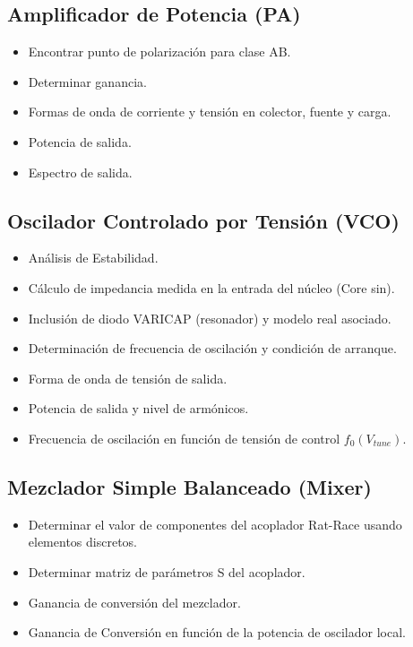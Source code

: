 \subsection{Amplificador de Potencia (PA)}
\begin{itemize}
    \item Encontrar punto de polarización para clase AB.
    \item Determinar ganancia.
    \item Formas de onda de corriente y tensión en colector, fuente y carga.
    \item Potencia de salida.
    \item Espectro de salida.
\end{itemize}

\subsection{Oscilador Controlado por Tensión (VCO)}
\begin{itemize}
    \item Análisis de Estabilidad.
    \item Cálculo de impedancia medida en la entrada del núcleo (Core sin).
    \item Inclusión de diodo VARICAP (resonador) y modelo real asociado.
    \item Determinación de frecuencia de oscilación y condición de arranque.
    \item Forma de onda de tensión de salida.
    \item Potencia de salida y nivel de armónicos.
    \item Frecuencia de oscilación en función de tensión de control $f_0(V_{tune})$.
\end{itemize}

\subsection{Mezclador Simple Balanceado (Mixer)}
\begin{itemize}
    \item Determinar el valor de componentes del acoplador Rat-Race usando elementos discretos.
    \item Determinar matriz de parámetros S del acoplador.
    \item Ganancia de conversión del mezclador.
    \item Ganancia de Conversión en función de la potencia de oscilador local.
\end{itemize}

